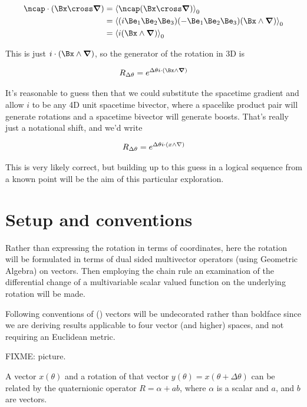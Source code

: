 \begin{align*}
\ncap \cdot (\Bx \cross \spacegrad) 
&=
\gpgradezero{ \ncap (\Bx \cross \spacegrad) } \\
&=
\gpgradezero{ (i \Be_1 \Be_2 \Be_3) (-\Be_1 \Be_2 \Be_3) (\Bx \wedge \spacegrad) } \\
&=
\gpgradezero{ i (\Bx \wedge \spacegrad) } \\
\end{align*}

This is just $i \cdot (\Bx \wedge \spacegrad)$, so the generator of the rotation in 3D is

\begin{align}\label{eqn:rotationGen:goo4}
R_{\Delta\theta} = e^{\Delta\theta i \cdot (\Bx \wedge \spacegrad)}
\end{align}

It's reasonable to guess then that we could substitute the spacetime gradient and allow $i$ to be any 4D unit spacetime bivector, where a spacelike product pair will generate rotations and a spacetime bivector will generate boosts.  That's really just a notational shift, and we'd write

\begin{align}\label{eqn:rotationGen:goo5}
R_{\Delta\theta} = e^{\Delta\theta i \cdot (x \wedge \nabla)}
\end{align}

This is very likely correct, but building up to this guess in a logical sequence from a known point will be the aim of this particular exploration.

\section{Setup and conventions}

Rather than expressing the rotation in terms of coordinates, here the rotation will be formulated in terms of dual sided multivector operators (using Geometric Algebra) on vectors.  Then employing the chain rule an examination of the differential change of a multivariable scalar valued function on the underlying rotation will be made.

Following conventions of (\cite{doran2003gap}) vectors will be undecorated rather than boldface since we are deriving results applicable to four vector (and higher) spaces, and not requiring an Euclidean metric.

FIXME: picture.

A vector $x(\theta)$ and a rotation of that vector $y(\theta) = x(\theta + \Delta\theta)$ can be related by the quaternionic operator $R = \alpha + a b$, where $\alpha$ is a scalar and $a$, and $b$ are vectors.


